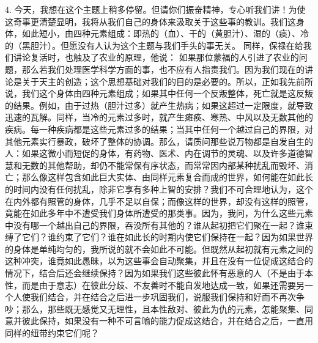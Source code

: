 4. 今天，我想在这个主题上稍多停留。但请你们振奋精神，专心听我们讲！为使这奇事更清楚显明，我将从我们自己的身体来汲取关于这些事的教训。我们这身体，如此短小，由四种元素组成：即热的（血）、干的（黄胆汁）、湿的（痰）、冷的（黑胆汁）。但愿没有人认为这个主题与我们手头的事无关。  同样，保禄在给我们讲论复活时，也触及了农业的原理，他说：  如果那位蒙福的人引进了农业的问题，那么若我们处理医学科学方面的事，也不应有人指责我们。因为我们现在的讲论是关于天主的创造；这个思想基础对我们的目的是必要的。所以，正如我先前所说，我们这个身体由四种元素组成；如果其中任何一个反叛整体，死亡就是这反叛的结果。例如，由于过热（胆汁过多）就产生热病；如果这超过一定限度，就导致迅速的瓦解。同样，当冷的元素过多时，就产生瘫痪、寒热、中风以及无数其他的疾病。每一种疾病都是这些元素过多的结果；当其中任何一个越过自己的界限，对其他元素实行暴政，破坏了整体的协调。那么，请质问那些说万物都是自发自生的人：如果这微小而短促的身体，有药物、医术、内在调节的灵魂、以及许多道德智慧和无数的其他帮助，却仍不能常保有序状态，而常常因内部某种扰乱而毁坏、消亡；那么像这样包含如此巨大实体、由同样元素复合而成的世界，如何能在如此长的时间内没有任何扰乱，除非它享有多种上智的安排？我们不可合理地认为，这个在内外都有照管的身体，几乎不足以自保；而像这样的世界，却没有这样的照管，竟能在如此多年中不遭受我们身体所遭受的那类事。因为，我问，为什么这些元素中没有哪一个越出自己的界限，吞没所有其他的？谁从起初把它们聚在一起？谁束缚了它们？谁约束了它们？谁在如此长的时期内使它们保持在一起？因为如果世界的身体是单纯均匀的，我所说的就不会如此不可能。但既然从起初就有元素之间的这种冲突，谁竟如此愚昧，以为这些事会自动聚集，并且在没有一位促成这结合的情况下，结合后还会继续保持？因为如果我们这些彼此怀有恶意的人（不是由于本性，而是由于意志）在彼此分歧、不友善时不能自发地达成一致，如果还需要另一个人使我们结合，并在结合之后进一步巩固我们，说服我们保持和好而不再次争吵；那么，那些既无感觉又无理性，且本性敌对、彼此为仇的元素，怎能聚集、同意并彼此保持，如果没有一种不可言喻的能力促成这结合，并在结合之后，一直用同样的纽带约束它们呢？\par

